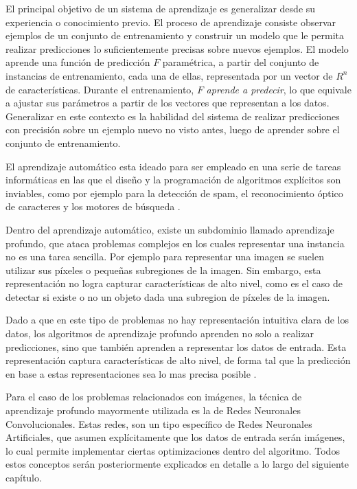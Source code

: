 \documentclass[a4paper,11pt,spanish]{book}
\begin{document}
    El principal objetivo de un sistema de aprendizaje es generalizar desde su experiencia o conocimiento previo.
    El proceso de aprendizaje consiste observar ejemplos de un conjunto de entrenamiento y construir un modelo que le permita realizar predicciones lo suficientemente precisas 
    sobre nuevos ejemplos. 
    El modelo aprende una función de predicción $F$ paramétrica, a partir del conjunto de instancias de entrenamiento, cada una de ellas, 
    representada por un vector de $R^n$ de características.  
    Durante el entrenamiento, $F$  \emph{aprende a predecir}, lo que equivale a ajustar sus parámetros a partir de los vectores que representan a los datos.
    Generalizar en este contexto es la habilidad del sistema de realizar predicciones con precisión sobre un ejemplo nuevo no visto antes, 
    luego de aprender sobre el conjunto de entrenamiento. 
    
    El aprendizaje automático esta ideado para ser empleado en una serie de tareas informáticas en las que el diseño y la programación de algoritmos explícitos son inviables,
    como por ejemplo para la detección de spam, el reconocimiento óptico de caracteres y los motores de búsqueda \cite{Bishop:MachineLearning}.

    Dentro del aprendizaje automático, existe un subdominio llamado aprendizaje profundo, que ataca problemas complejos en los cuales representar una instancia 
    no es una tarea sencilla.
    Por ejemplo para representar una imagen se suelen utilizar sus píxeles o pequeñas subregiones de la imagen. Sin embargo, esta representación no logra capturar 
    características de alto nivel, como es el caso de detectar si existe o no un objeto dada una subregion de píxeles de la imagen.

    Dado a que en este tipo de problemas no hay representación intuitiva clara de los datos, los algoritmos de aprendizaje profundo aprenden no solo a realizar predicciones, 
    sino que también aprenden a representar los datos de entrada. 
    Esta representación captura características de alto nivel, de forma tal que la predicción en base a estas representaciones sea lo mas precisa posible \cite{Goodfellow-et-al-2016}.

    Para el caso de los problemas relacionados con imágenes, la técnica de aprendizaje profundo mayormente utilizada es la de Redes Neuronales Convolucionales.
    Estas redes, son un tipo específico de Redes Neuronales Artificiales, que asumen explícitamente que los datos de entrada serán imágenes, lo cual permite implementar
    ciertas optimizaciones dentro del algoritmo. Todos estos conceptos serán posteriormente explicados en detalle a lo largo del siguiente capítulo.
\end{document}
